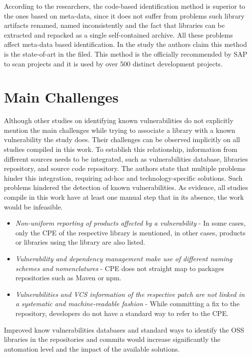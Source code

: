 \documentclass[pdf,bookmarks,colorlinks=true]{IEEEtran}
\begin{document}
According to the researchers, the code-based identification method is superior to the ones based on meta-data, since it does not suffer from problems such library artifacts renamed, named inconsistently and the fact that libraries can be extracted and repacked as a single self-contained archive. All these problems affect meta-data based identification. In the study \cite{Plate2015} the authors claim this method is the state-of-art in the filed.
This method is the officially recommended by SAP to scan projects and it is used by over 500 distinct development projects.


\section{Main Challenges}
\label{sec:MainChallenges}


Although other studies on identifying known vulnerabilities do not explicitly mention the main challenges while trying to associate a library with a known vulnerability the study \cite{Plate2015} does. Their challenges can be observed implicitly on all studies compiled in this work. To establish this relationship, information from different sources needs to be integrated, such as vulnerabilities database, libraries repository, and source code repository.
The authors state that multiple problems hinder this integration, requiring ad-hoc and technology-specific solutions. Such problems hindered the detection of known vulnerabilities. As evidence, all studies compile in this work have at least one manual step that in its absence, the work would be infeasible.
\begin{itemize}
\item
{\em Non-uniform reporting of products affected by a vulnerability} - In some cases, only the CPE of the respective library is mentioned, in other cases, products or libraries using the library are also listed.  
\item
{\em Vulnerability and dependency management make use of different naming schemes and nomenclatures} - CPE does not straight map to packages repositories such as Maven or npm.
\item
{\em Vulnerabilities and VCS information of the respective patch are not linked in a systematic and machine-readable fashion} - While committing a fix to the repository, developers do not have a standard way to refer to the CPE.

\end{itemize}
Improved know vulnerabilities databases and standard ways to identify the OSS libraries in the repositories and commits would increase significantly the automation level and the impact of the available solutions.
\end{document}
